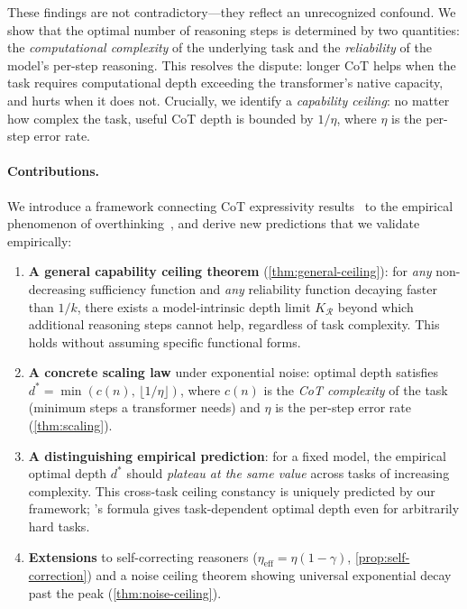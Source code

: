 \documentclass{article}
\theoremstyle{definition}
\theoremstyle{remark}
\newcommand{\depth}{d^*}       %
\newcommand{\noise}{\eta}      %
\newcommand{\neff}{\noise_{\mathrm{eff}}} %
\newcommand{\rel}{\mathcal{R}} %
\newcommand{\ccot}{c}          %
\begin{document}
These findings are not contradictory---they reflect an unrecognized confound. We show that the optimal number of reasoning steps is determined by two quantities: the \emph{computational complexity} of the underlying task and the \emph{reliability} of the model's per-step reasoning. This resolves the dispute: longer CoT helps when the task requires computational depth exceeding the transformer's native capacity, and hurts when it does not. Crucially, we identify a \emph{capability ceiling}: no matter how complex the task, useful CoT depth is bounded by $1/\noise$, where $\noise$ is the per-step error rate.

\paragraph{Contributions.} We introduce a framework connecting CoT expressivity results~\cite{li2024chain,merrill2024expressive} to the empirical phenomenon of overthinking~\cite{hassid2025overthink,wu2025when}, and derive new predictions that we validate empirically:
\begin{enumerate}
\item \textbf{A general capability ceiling theorem} (\cref{thm:general-ceiling}): for \emph{any} non-decreasing sufficiency function and \emph{any} reliability function decaying faster than $1/k$, there exists a model-intrinsic depth limit $K_\rel$ beyond which additional reasoning steps cannot help, regardless of task complexity. This holds without assuming specific functional forms.

\item \textbf{A concrete scaling law} under exponential noise: optimal depth satisfies $\depth = \min(\ccot(n),\, \lfloor 1/\noise \rfloor)$, where $\ccot(n)$ is the \emph{CoT complexity} of the task (minimum steps a transformer needs) and $\noise$ is the per-step error rate (\cref{thm:scaling}).

\item \textbf{A distinguishing empirical prediction}: for a fixed model, the empirical optimal depth $\depth$ should \emph{plateau at the same value} across tasks of increasing complexity. This cross-task ceiling constancy is uniquely predicted by our framework; \citet{wu2025when}'s formula gives task-dependent optimal depth even for arbitrarily hard tasks.

\item \textbf{Extensions} to self-correcting reasoners ($\neff = \noise(1-\gamma)$, \cref{prop:self-correction}) and a noise ceiling theorem showing universal exponential decay past the peak (\cref{thm:noise-ceiling}).
\end{enumerate}
\end{document}
